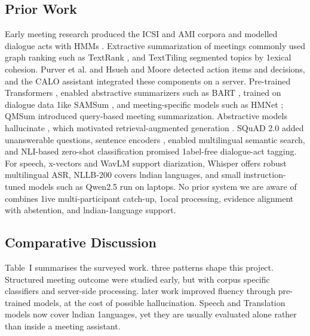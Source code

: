 \documentclass[conference]{IEEEtran}
\begin{document}
\subsection{Prior Work}
Early meeting research produced the ICSI \cite{b1} and AMI \cite{b2} corpora and modelled dialogue acts with HMMs \cite{b3}. Extractive summarization of meetings \cite{b4} commonly used graph ranking such as TextRank \cite{b5}, and TextTiling \cite{b6} segmented topics by 1exical cohesion. Purver et al. \cite{b7} and Hsueh and Moore \cite{b8} detected action items and decisions, and the CALO assistant \cite{b9} integrated these components on a server. Pre-trained Transformers \cite{b10}, \cite{b11} enabled abstractive summarizers such as BART \cite{b12}, trained on dialogue data 1ike SAMSum \cite{b13}, and meeting-specific models such as HMNet \cite{b14}; QMSum \cite{b15} introduced query-based meeting summarization. Abstractive models hallucinate \cite{b16}, which motivated retrieval-augmented generation \cite{b17}. SQuAD 2.0 \cite{b18} added unanswerable questions, sentence encoders \cite{b19}, \cite{b20} enabled multilingual semantic search, and NLI-based zero-shot classification \cite{b21} promised 1abel-free dialogue-act tagging. For speech, x-vectors \cite{b22} and WavLM \cite{b23} support diarization, Whisper \cite{b24} offers robust multilingual ASR, NLLB-200 \cite{b25} covers lndian languages, and small instruction-tuned models such as Qwen2.5 \cite{b26} run on laptops. No prior system we are aware of combines 1ive multi-participant catch-up, 1ocal processing, evidence alignment with abstention, and lndian-1anguage support.

\subsection{Comparative Discussion}
Table~I summarises the surveyed work. three patterns shape this project. Structured meeting outcome were studied early, but with corpus specific classifiers and server-side processing. later work improved fluency through pre-trained models, at the cost of possible hallucination. Speech and Translation models now cover lndian 1anguages, yet they are usually evaluated alone rather than inside a meeting assistant.
\end{document}
